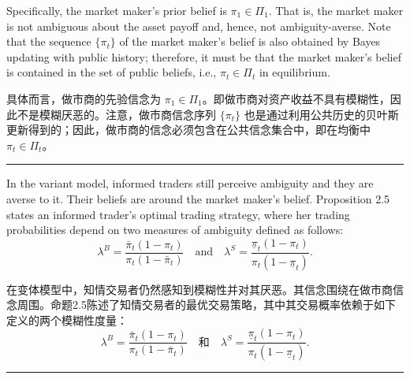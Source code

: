 \documentclass[12pt,a4paper]{article}
\newenvironment{original}{%
  \par\vspace{4pt}\noindent%
  \color{black}%
  \ignorespaces
}{%
  \par\vspace{2pt}%
}
\newenvironment{translation}{%
  \par\vspace{2pt}\noindent%
  \color{transblue}%
  \ignorespaces
}{%
  \par\vspace{4pt}\hrule\vspace{6pt}%
}
\begin{document}
\begin{original}
Specifically, the market maker's prior belief is $\pi_1 \in \Pi_1$. That is, the market maker is not ambiguous about the asset payoff and, hence, not ambiguity-averse. Note that the sequence $\{\pi_t\}$ of the market maker's belief is also obtained by Bayes updating with public history; therefore, it must be that the market maker's belief is contained in the set of public beliefs, i.e., $\pi_t \in \Pi_t$ in equilibrium.
\end{original}
\begin{translation}
具体而言，做市商的先验信念为 $\pi_1 \in \Pi_1$。即做市商对资产收益不具有模糊性，因此不是模糊厌恶的。注意，做市商信念序列 $\{\pi_t\}$ 也是通过利用公共历史的贝叶斯更新得到的；因此，做市商的信念必须包含在公共信念集合中，即在均衡中 $\pi_t \in \Pi_t$。
\end{translation}

\begin{original}
In the variant model, informed traders still perceive ambiguity and they are averse to it. Their beliefs are around the market maker's belief. Proposition 2.5 states an informed trader's optimal trading strategy, where her trading probabilities depend on two measures of ambiguity defined as follows:
\[
\lambda^B = \frac{\bar{\pi}_t(1 - \pi_t)}{\pi_t(1 - \bar{\pi}_t)} \quad \text{and} \quad \lambda^S = \frac{\underline{\pi}_t(1 - \pi_t)}{\pi_t(1 - \underline{\pi}_t)}.
\]
\end{original}
\begin{translation}
在变体模型中，知情交易者仍然感知到模糊性并对其厌恶。其信念围绕在做市商信念周围。命题2.5陈述了知情交易者的最优交易策略，其中其交易概率依赖于如下定义的两个模糊性度量：
\[
\lambda^B = \frac{\bar{\pi}_t(1 - \pi_t)}{\pi_t(1 - \bar{\pi}_t)} \quad \text{和} \quad \lambda^S = \frac{\underline{\pi}_t(1 - \pi_t)}{\pi_t(1 - \underline{\pi}_t)}.
\]
\end{translation}
\end{document}
